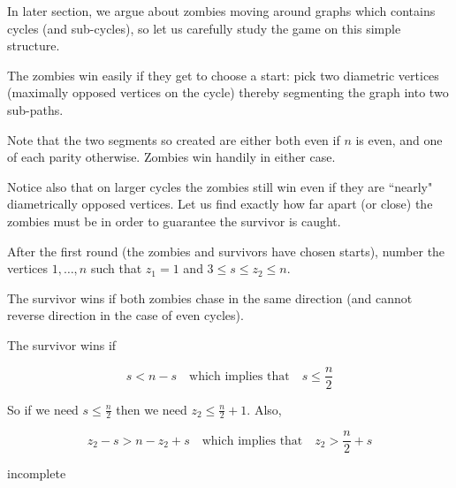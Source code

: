 In later section, we argue about zombies moving around graphs which contains cycles
(and sub-cycles), so let us carefully study the game on this simple structure.

The zombies win easily if they get to choose a start: pick two diametric vertices
(maximally opposed vertices on the cycle) thereby segmenting the graph into two sub-paths.

Note that the two segments so created are either both even if $n$ is even, and
one of each parity otherwise. Zombies win handily in either case.

Notice also that on larger cycles the zombies still win even if they are
``nearly" diametrically opposed vertices. Let us find exactly how far apart (or close)
the zombies must be in order to guarantee the survivor is caught.

After the first round (the zombies and survivors have chosen starts),
number the vertices $1, \dots, n$ such that $z_1 = 1$ and $3 \leq s \leq z_2 \leq n$.

The survivor wins if both zombies chase in the same direction (and cannot reverse direction
in the case of even cycles).

The survivor wins if

\[ s < n -s \quad \text{which implies that} \quad s \leq \frac{n}{2} \]

So if we need $s \leq \frac{n}{2}$ then we need $z_2 \leq \frac{n}{2} +1$. Also,

\[ z_2 - s > n - z_2 + s \quad \text{which implies that} \quad z_2 > \frac{n}{2} + s\]

incomplete
